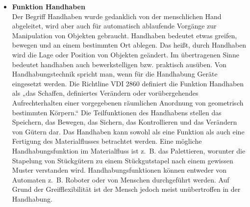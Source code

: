 \begin{itemize}
\item \textbf{Funktion Handhaben } \\
Der Begriff Handhaben wurde gedanklich von der menschlichen Hand abgeleitet, wird aber auch f\"ur 
automatisch ablaufende Vorg\"ange zur Manipulation von Objekten gebraucht.
Handhaben bedeutet etwas greifen, bewegen und an einem bestimmten Ort ablegen.
Das hei\ss t, durch Handhaben wird die Lage oder Position von Objekten ge\"andert.
Im \"ubertragenen Sinne bedeutet handhaben auch bewerkstelligen bzw. praktisch aus\"uben.
Von Handhabungstechnik spricht man, wenn f\"ur die Handhabung Ger\"ate eingesetzt werden.
Die Richtline VDI 2860 definiert die Funktion Handhaben als „das Schaffen, definiertes Ver\"andern 
oder vor\"ubergehendes Aufrechterhalten einer vorgegebenen r\"aumlichen Anordnung von geometrisch bestimmten K\"orpern.“
Die Teilfunktionen des Handhabens stellen das Speichern, das Bewegen, das Sichern, das Kontrollieren und das Ver\"andern von G\"utern dar.
Das Handhaben kann sowohl als eine Funktion als auch eine Fertigung des Materialflusses betrachtet werden.
Eine m\"ogliche Handhabungsfunktion im Materialfluss ist z.~B. das Palettieren, worunter die Stapelung von 
St\"uckg\"utern zu einem St\"uckgutstapel nach einem gewissen Muster verstanden wird.
Handhabungsfunktionen k\"onnen entweder von Automaten z.~B. Roboter oder von Menschen durchgef\"uhrt werden.
Auf Grund der Greifflexibilit\"at ist der Mensch jedoch meist un\"ubertroffen in der Handhabung.
\end{itemize}

